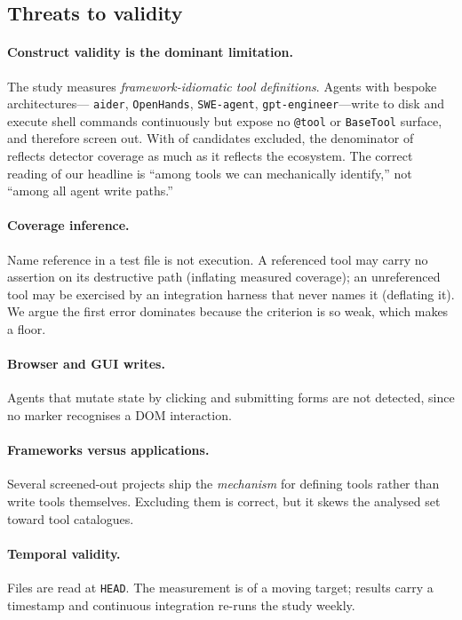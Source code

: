 \documentclass[11pt]{article}
\begin{document}
\subsection{Threats to validity}
\label{sec:threats}

\paragraph{Construct validity is the dominant limitation.} The study measures
\emph{framework-idiomatic tool definitions}. Agents with bespoke architectures---%
\texttt{aider}, \texttt{OpenHands}, \texttt{SWE-agent}, \texttt{gpt-engineer}---write to
disk and execute shell commands continuously but expose no \texttt{@tool} or
\texttt{BaseTool} surface, and therefore screen out. With \AcScreenedOut{} of
\AcCandidates{} candidates excluded, the denominator of \AcRepos{} reflects detector
coverage as much as it reflects the ecosystem. The correct reading of our headline is
``among tools we can mechanically identify,'' not ``among all agent write paths.''

\paragraph{Coverage inference.} Name reference in a test file is not execution. A
referenced tool may carry no assertion on its destructive path (inflating measured
coverage); an unreferenced tool may be exercised by an integration harness that never
names it (deflating it). We argue the first error dominates because the criterion is so
weak, which makes \AcUncoveredPct{} a floor.

\paragraph{Browser and GUI writes.} Agents that mutate state by clicking and submitting
forms are not detected, since no marker recognises a DOM interaction.

\paragraph{Frameworks versus applications.} Several screened-out projects ship the
\emph{mechanism} for defining tools rather than write tools themselves. Excluding them
is correct, but it skews the analysed set toward tool catalogues.

\paragraph{Temporal validity.} Files are read at \texttt{HEAD}. The measurement is of a
moving target; results carry a timestamp and continuous integration re-runs the study
weekly.
\end{document}
